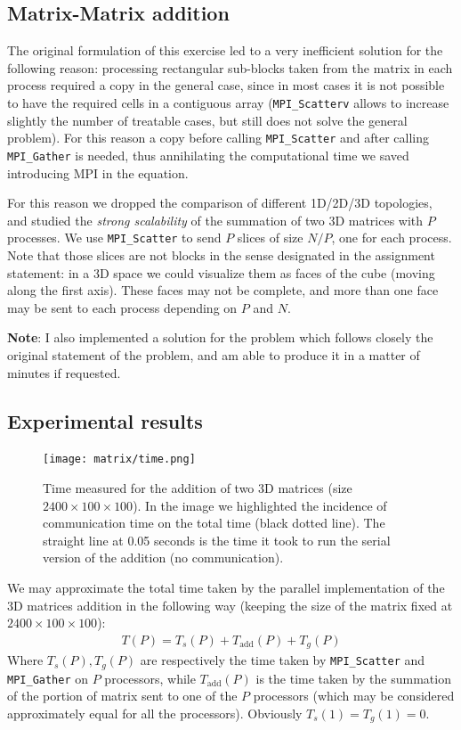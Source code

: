 \documentclass{article}
\begin{document}
\subsection{Matrix-Matrix addition}
The original formulation of this exercise led to a very inefficient solution for the following reason: processing rectangular sub-blocks taken from the matrix in each process required a copy in the general case, since in most cases it is not possible to have the required cells in a contiguous array (\texttt{MPI\_Scatterv} allows to increase slightly the number of treatable cases, but still does not solve the general problem). For this reason a copy before calling \texttt{MPI\_Scatter} and after calling \texttt{MPI\_Gather} is needed, thus annihilating the computational time we saved introducing MPI in the equation.

For this reason we dropped the comparison of different 1D/2D/3D topologies, and studied the \emph{strong scalability} of the summation of two 3D matrices with $P$ processes. We use \texttt{MPI\_Scatter} to send $P$ slices of size $N/P$, one for each process. Note that those slices are not blocks in the sense designated in the assignment statement: in a 3D space we could visualize them as faces of the cube (moving along the first axis). These faces may not be complete, and more than one face may be sent to each process depending on $P$ and $N$.

\textbf{Note}: I also implemented a solution for the problem which follows closely the original statement of the problem, and am able to produce it in a matter of minutes if requested.

\subsection{Experimental results}
\begin{figure}[b!]
    \centering
    \texttt{[image: matrix/time.png]}
    \caption{Time measured for the addition of two 3D matrices (size $2400\times 100\times 100$). In the image we highlighted the incidence of communication time on the total time (black dotted line). The straight line at 0.05 seconds is the time it took to run the serial version of the addition (no communication).}
    \label{fig:matrix_performance}
\end{figure}

We may approximate the total time taken by the parallel implementation of the 3D matrices addition in the following way (keeping the size of the matrix fixed at $2400\times 100\times 100$):
\begin{gather}\label{eq:matrix_time_equation}
    T(P) = T_s(P) + T_\text{add}(P) + T_g(P)
\end{gather}
Where $T_s(P), T_g(P)$ are respectively the time taken by \texttt{MPI\_Scatter} and \texttt{MPI\_Gather} on $P$ processors, while $T_\text{add}(P)$ is the time taken by the summation of the portion of matrix sent to one of the $P$ processors (which may be considered approximately equal for all the processors). Obviously $T_s(1) = T_g(1) = 0$.
\end{document}
